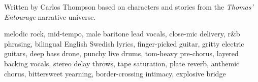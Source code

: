 
\label{sec:that-night}
\begin{notes}
Written by Carlos Thompson based on characters and stories from the \emph{Thomas’ Entourage} narrative universe.
\end{notes}
\begin{style}
melodic rock, mid-tempo, male baritone lead vocals, close-mic delivery, r\&b phrasing, bilingual English Swedish lyrics, finger-picked guitar, gritty electric guitars, deep bass drone, punchy live drums, tom-heavy pre-chorus, layered backing vocals, stereo delay throws, tape saturation, plate reverb, anthemic chorus, bittersweet yearning, border-crossing intimacy, explosive bridge
\end{style}
